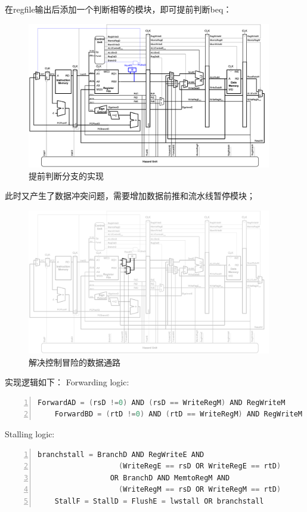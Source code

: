 \newpage
在regfile输出后添加一个判断相等的模块，即可提前判断beq：
\begin{figure}[htbp]
    \centering
    \includegraphics[width = 0.95\textwidth]{image/pre-condition.png}
    \caption{提前判断分支的实现}
    \label{fig:section_2_9}
\end{figure}

\newpage
此时又产生了数据冲突问题，需要增加数据前推和流水线暂停模块；

\begin{figure}[htbp]
    \centering
    \includegraphics[width = 0.95\textwidth]{image/hazard_handle_control_hazard.png}
    \caption{解决控制冒险的数据通路}
    \label{fig:section_2_9}
\end{figure}

实现逻辑如下：
Forwarding logic:
\begin{lstlisting}[language=Verilog,caption=控制冒险前推的实现逻辑,numbers=left,xleftmargin=5em,xrightmargin=5em, aboveskip=2em]
	ForwardAD = (rsD !=0) AND (rsD == WriteRegM) AND RegWriteM
	ForwardBD = (rtD !=0) AND (rtD == WriteRegM) AND RegWriteM
\end{lstlisting}

Stalling logic:
\begin{lstlisting}[language=Verilog,caption=控制冒险暂停的实现逻辑,numbers=left,xleftmargin=5em,xrightmargin=5em, aboveskip=2em]
	branchstall = BranchD AND RegWriteE AND 
                   (WriteRegE == rsD OR WriteRegE == rtD) 
                 OR BranchD AND MemtoRegM AND 
                   (WriteRegM == rsD OR WriteRegM == rtD)
	StallF = StallD = FlushE = lwstall OR branchstall
\end{lstlisting}

